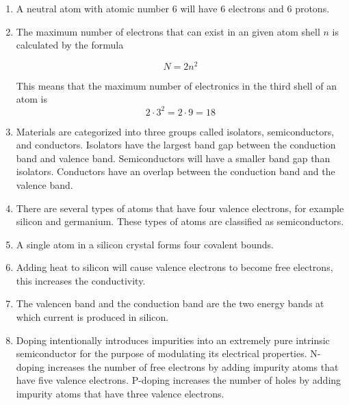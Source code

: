 \documentclass[fleqn]{article}
\begin{document}
\begin{enumerate}[label=\textbf{\arabic*.}]

\item A neutral atom with atomic number 6 will have 6 electrons and 6 protons. 
  
\item The maximum number of electrons that can exist in an given atom shell $ n $ is calculated by the formula

\[
  N = 2n^2
\]

This means that the maximum number of electronics in the third shell of an atom is
\[ 
  2 \cdot 3^2 = 2 \cdot 9 = 18
\]

\item
Materials are categorized into three groups called isolators, semiconductors, and conductors. Isolators have the largest band gap between the conduction band and valence band. Semiconductors will have a smaller band gap than isolators. Conductors have an overlap between the conduction band and the valence band.

\item
There are several types of atoms that have four valence electrons, for example silicon and germanium. These types of atoms are classified as semiconductors.

\item
A single atom in a silicon crystal forms four covalent bounds.

\item
Adding heat to silicon will cause valence electrons to become free electrons, this increases the conductivity.

\item
The valencen band and the conduction band are the two energy bands at which current is produced in silicon.

\item
Doping intentionally introduces impurities into an extremely pure intrinsic semiconductor for the purpose of modulating its electrical properties. N-doping increases the number of free electrons by adding impurity atoms that have five valence electrons. P-doping increases the number of holes by adding impurity atoms that have three valence electrons.

\end{enumerate}
\end{document}
